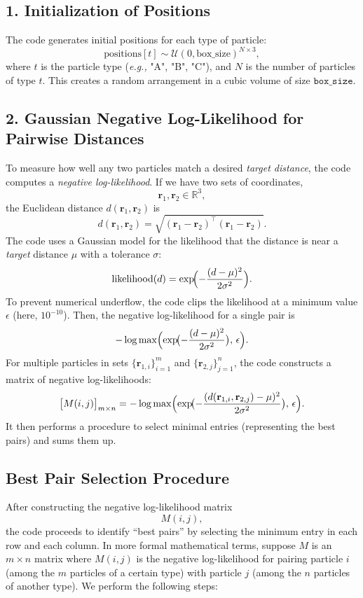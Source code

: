 \documentclass[12pt]{article}
\begin{document}
\subsection*{1. Initialization of Positions}

The code generates initial positions for each type of particle:
\[
\text{positions}[t] \sim \mathcal{U}(0,\text{box\_size})^{N \times 3},
\]
where $t$ is the particle type (\emph{e.g.,} "A", "B", "C"), and $N$ is the number of particles of type $t$. This creates a random arrangement in a cubic volume of size $\texttt{box\_size}$. 

\subsection*{2. Gaussian Negative Log-Likelihood for Pairwise Distances}

To measure how well any two particles match a desired \emph{target distance}, the code computes a \textit{negative log-likelihood}. If we have two sets of coordinates,
\[
\mathbf{r}_1, \mathbf{r}_2 \in \mathbb{R}^{3},
\]
the Euclidean distance $d(\mathbf{r}_1, \mathbf{r}_2)$ is
\[
d(\mathbf{r}_1, \mathbf{r}_2) = \sqrt{(\mathbf{r}_1 - \mathbf{r}_2)^\top(\mathbf{r}_1 - \mathbf{r}_2)}.
\]
The code uses a Gaussian model for the likelihood that the distance is near a \emph{target} distance $\mu$ with a tolerance $\sigma$:
\[
\text{likelihood}(d) = \exp\!\Bigl(-\frac{(d - \mu)^2}{2 \sigma^2}\Bigr).
\]
To prevent numerical underflow, the code clips the likelihood at a minimum value $\epsilon$ (here, $10^{-10}$). Then, the negative log-likelihood for a single pair is
\[
-\log \max\Bigl(\exp\!\bigl(-\frac{(d - \mu)^2}{2 \sigma^2}\bigr), \, \epsilon\Bigr).
\]
For multiple particles in sets $\{\mathbf{r}_{1,i}\}_{i=1}^m$ and $\{\mathbf{r}_{2,j}\}_{j=1}^n$, the code constructs a matrix of negative log-likelihoods:
\[
\bigl[M(i,j)\bigr]_{m \times n} 
= -\log \max\Bigl(\exp\!\bigl(-\frac{(d(\mathbf{r}_{1,i}, \mathbf{r}_{2,j}) - \mu)^2}{2 \sigma^2}\bigr), \, \epsilon\Bigr).
\]
It then performs a procedure to select minimal entries (representing the best pairs) and sums them up.

\subsection*{Best Pair Selection Procedure}

After constructing the negative log-likelihood matrix 
\[
M(i,j), 
\]
the code proceeds to identify ``best pairs'' by selecting the minimum entry in each row and each column. In more formal mathematical terms, suppose \(M\) is an \(m \times n\) matrix where \(M(i,j)\) is the negative log-likelihood for pairing particle \(i\) (among the \(m\) particles of a certain type) with particle \(j\) (among the \(n\) particles of another type). We perform the following steps:
\end{document}
